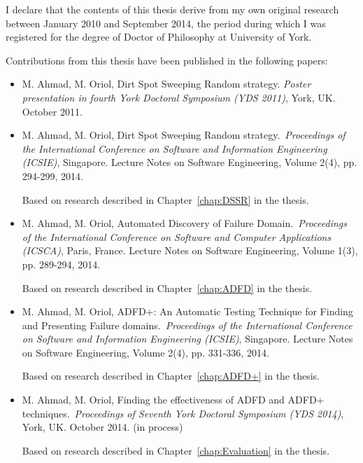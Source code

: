 \begin{declaration}

I declare that the contents of this thesis derive from my own original research between January 2010 and September 2014, the period during which I was registered for the degree of Doctor of Philosophy at University of York.

Contributions from this thesis have been published in the following papers: 

\begin{itemize}

\item M. Ahmad, M. Oriol, Dirt Spot Sweeping Random strategy. \textit{Poster presentation in fourth York Doctoral Symposium (YDS 2011)}, York, UK. October 2011.

\item M. Ahmad, M. Oriol, Dirt Spot Sweeping Random strategy.~\textit{Proceedings of the International Conference on Software and Information Engineering (ICSIE)}, Singapore. Lecture Notes on Software Engineering, Volume 2(4), pp. 294-299, 2014.

Based on research described in Chapter~\ref{chap:DSSR} in the thesis.\\

\item M. Ahmad, M. Oriol, Automated Discovery of Failure Domain.~\textit{Proceedings of the International Conference on Software and Computer Applications (ICSCA)}, Paris, France. Lecture Notes on Software Engineering, Volume 1(3), pp. 289-294, 2014.

Based on research described in Chapter~\ref{chap:ADFD} in the thesis.\\

\item M. Ahmad, M. Oriol, ADFD+: An Automatic Testing Technique for Finding and Presenting Failure domains.~\textit{Proceedings of the International Conference on Software and Information Engineering (ICSIE)}, Singapore. Lecture Notes on Software Engineering, Volume 2(4), pp. 331-336, 2014.

Based on research described in Chapter~\ref{chap:ADFD+} in the thesis.\\

\item M. Ahmad, M. Oriol, Finding the effectiveness of ADFD and ADFD+ techniques.~\textit{Proceedings of Seventh York Doctoral Symposium (YDS 2014)}, York, UK. October 2014. (in process)

Based on research described in Chapter~\ref{chap:Evaluation} in the thesis.

\end{itemize}

\end{declaration}